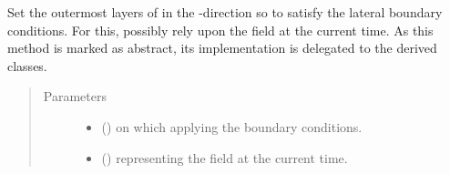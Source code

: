 \documentclass[letterpaper,10pt,english]{sphinxmanual}
\begin{document}
\begin{fulllineitems}
\begin{fulllineitems}
\label{\detokenize{api:dycore.horizontal_boundary.HorizontalBoundary.set_outermost_layers_y}}
Set the outermost layers of  in the -direction so to satisfy the lateral
boundary conditions. For this, possibly rely upon the field  at the current time.
As this method is marked as abstract, its implementation is delegated to the derived classes.
\begin{quote}\begin{description}
\item[{Parameters}] \leavevmode\begin{itemize}
\item {} 
 () \textendash{}  on which applying the boundary conditions.

\item {} 
 () \textendash{}  representing the field at the current time.

\end{itemize}

\end{description}\end{quote}

\end{fulllineitems}


\end{fulllineitems}

\end{document}
